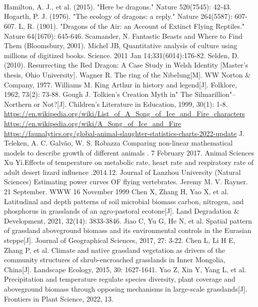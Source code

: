 \documentclass[12pt]{article}  %
\begin{document}
\\
\\
\\
\begin{thebibliography}{99}
	\vspace{-0.5cm}
	 Hamilton, A. J., et al. (2015). "Here be dragons." Nature 520(7545): 42-43.
     Hogarth, P. J. (1976). "The ecology of dragons: a reply." Nature 264(5587): 607-607.
     L, R. (1901). "Dragons of the Air: an Account of Extinct Flying Reptiles." Nature 64(1670): 645-646.
     Scamander, N. Fantastic Beasts and Where to Find Them (Bloomsbury, 2001).
     Michel JB, Quantitative analysis of culture using millions of digitized books. Science. 2011 Jan 14;331(6014):176-82.
	 Selden, D. (2010). Resurrecting the Red Dragon: A Case Study in Welsh Identity [Master's thesis, Ohio University]. 
     Wagner R. The ring of the Nibelung[M]. WW Norton \& Company, 1977.
     Williams M. King Arthur in history and legend[J]. Folklore, 1962, 73(2): 73-88.
     Gough J. Tolkien's Creation Myth in" The Silmarillion"--Northern or Not?[J]. Children's Literature in Education, 1999, 30(1): 1-8.
    \url{https://en.wikipedia.org/wiki/List_of_A_Song_of_Ice_and_Fire_characters}
    \url{https://en.wikipedia.org/wiki/A_Song_of_Ice_and_Fire}
    \url{https://faunalytics.org/global-animal-slaughter-statistics-charts-2022-update}
    J. Teleken, A. C. Galvão, W. S. Robazza
     Comparing non-linear mathematical models to describe growth of different animals
 . 7 February 2017. Animal Sciences
    Xu Yi.Effects of temperature on metabolic rate, heart rate and respiratory rate of adult desert lizard influence .2014.12. Journal of Lanzhou University (Natural Sciences)
    Estimating power curves OF flying vertebrates. Jeremy M. V. Rayner. 21 September. WWW 16 November 1999
 Chen X, Zhang H, Yao X, et al. Latitudinal and depth patterns of soil microbial biomass carbon, nitrogen, and phosphorus in grasslands of an agro‐pastoral ecotone[J]. Land Degradation \& Development, 2021, 32(14): 3833-3846.
     Jiao C, Yu G, He N, et al. Spatial pattern of grassland aboveground biomass and its environmental controls in the Eurasian steppe[J]. Journal of Geographical Sciences, 2017, 27: 3-22.
     Chen L, Li H E, Zhang P, et al. Climate and native grassland vegetation as drivers of the community structures of shrub-encroached grasslands in Inner Mongolia, China[J]. Landscape Ecology, 2015, 30: 1627-1641.
     Yao Z, Xin Y, Yang L, et al. Precipitation and temperature regulate species diversity, plant coverage and aboveground biomass through opposing mechanisms in large-scale grasslands[J]. Frontiers in Plant Science, 2022, 13.


\end{thebibliography}
\end{document}
